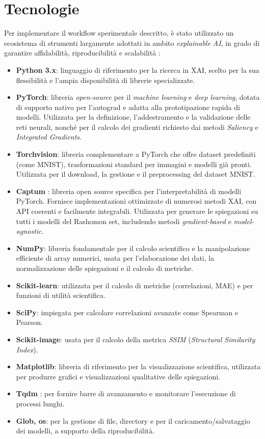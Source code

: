 \documentclass[12pt,a4paper,oneside]{report}
\numberwithin{figure}{chapter}
\numberwithin{table}{chapter}
\begin{document}
\section{Tecnologie}
Per implementare il workflow sperimentale descritto, è stato utilizzato un
ecosistema di strumenti largamente adottati in ambito \emph{explainable AI}, in
grado di garantire affidabilità, riproducibilità e scalabilità
\citep{adadi2018survey,mueller2023rashomon}:

\begin{itemize}
      \item \textbf{Python 3.x}: linguaggio di riferimento per la ricerca in XAI, scelto per la sua flessibilità e l’ampia disponibilità di librerie specializzate.
      \item \textbf{PyTorch}: libreria \emph{open-source} per il \emph{machine learning} e \emph{deep learning}, dotata di supporto nativo per l’autograd e adatta alla prototipazione rapida di modelli. Utilizzata per la definizione, l’addestramento e la validazione delle reti neurali, nonché per il calcolo dei gradienti richiesto dai metodi \emph{Saliency} e \emph{Integrated Gradients}.
      \item \textbf{Torchvision}: libreria complementare a PyTorch che offre dataset predefiniti (come MNIST), trasformazioni standard per immagini e modelli già pronti. Utilizzata per il download, la gestione e il preprocessing del dataset MNIST.
      \item \textbf{Captum} \citep{kokhlikyan2020captum}: libreria open source specifica per l’interpretabilità di modelli PyTorch. Fornisce implementazioni ottimizzate di numerosi metodi XAI, con API coerenti e facilmente integrabili. Utilizzata per generare le spiegazioni su tutti i modelli del Rashomon set, includendo metodi \emph{gradient-based} e \emph{model-agnostic}.
      \item \textbf{NumPy}: libreria fondamentale per il calcolo scientifico e la manipolazione efficiente di array numerici, usata per l’elaborazione dei dati, la normalizzazione delle spiegazioni e il calcolo di metriche.
      \item \textbf{Scikit-learn}: utilizzata per il calcolo di metriche (correlazioni, MAE) e per funzioni di utilità scientifica.
      \item \textbf{SciPy}: impiegata per calcolare correlazioni avanzate come Spearman e Pearson.
      \item \textbf{Scikit-image}: usata per il calcolo della metrica \emph{SSIM} (\emph{Structural Similarity Index}).
      \item \textbf{Matplotlib}: libreria di riferimento per la visualizzazione scientifica, utilizzata per produrre grafici e visualizzazioni qualitative delle spiegazioni.
      \item \textbf{Tqdm} \citep{tqdm}: per fornire barre di avanzamento e monitorare l’esecuzione di processi lunghi.
      \item \textbf{Glob, os}: per la gestione di file, directory e per il caricamento/salvataggio dei modelli, a supporto della riproducibilità.
\end{itemize}
\end{document}
